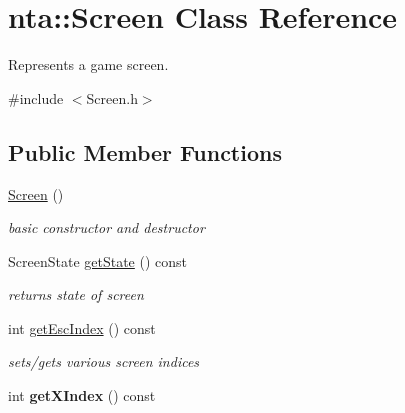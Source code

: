 \hypertarget{classnta_1_1Screen}{}\section{nta\+:\+:Screen Class Reference}
\label{classnta_1_1Screen}


Represents a game screen.  




{\ttfamily \#include $<$Screen.\+h$>$}

\subsection*{Public Member Functions}
\begin{DoxyCompactItemize}
\item 
\mbox{\label{classnta_1_1Screen_a86944d19cec1189fee2945a4f8dae477}} 
\hyperlink{classnta_1_1Screen_a86944d19cec1189fee2945a4f8dae477}{Screen} ()
\begin{DoxyCompactList}\small\item\em basic constructor and destructor \end{DoxyCompactList}\item 
\mbox{\label{classnta_1_1Screen_a2d53fc8f7ac43307896863fd6b3cad1c}} 
Screen\+State \hyperlink{classnta_1_1Screen_a2d53fc8f7ac43307896863fd6b3cad1c}{get\+State} () const
\begin{DoxyCompactList}\small\item\em returns state of screen \end{DoxyCompactList}\item 
\mbox{\label{classnta_1_1Screen_a506f2266b008ccd071f630a5c252567e}} 
int \hyperlink{classnta_1_1Screen_a506f2266b008ccd071f630a5c252567e}{get\+Esc\+Index} () const
\begin{DoxyCompactList}\small\item\em sets/gets various screen indices \end{DoxyCompactList}\item 
\mbox{\label{classnta_1_1Screen_a01f4fdd4cadd6abe4fef2605a0fde52a}} 
int {\bfseries get\+X\+Index} () const
\item 
\mbox{\label{classnta_1_1Screen_aba9c09cd06dfc05557b86d866a7fb2b9}} 

\end{DoxyCompactItemize}
